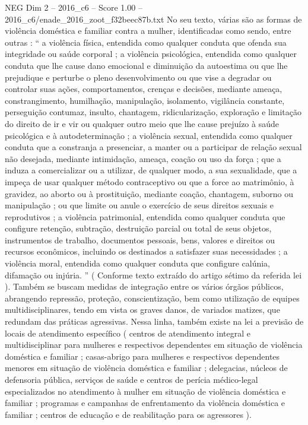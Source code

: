 \begin{textsample}{NEG Dim 2 – 2016\_c6 – Score 1.00 – 2016\_c6/enade\_2016\_zoot\_f32beec87b.txt}
No seu texto, várias são as formas de violência doméstica e familiar contra a mulher, identificadas como sendo, entre outras : “ a violência física, entendida como qualquer conduta que ofenda sua integridade ou saúde corporal ; a violência psicológica, entendida como qualquer conduta que lhe cause dano emocional e diminuição da autoestima ou que lhe prejudique e perturbe o pleno desenvolvimento ou que vise a degradar ou controlar suas ações, comportamentos, crenças e decisões, mediante ameaça, constrangimento, humilhação, manipulação, isolamento, vigilância constante, perseguição contumaz, insulto, chantagem, ridicularização, exploração e limitação do direito de ir e vir ou qualquer outro meio que lhe cause prejuízo à saúde psicológica e à autodeterminação ; a violência sexual, entendida como qualquer conduta que a constranja a presenciar, a manter ou a participar de relação sexual não desejada, mediante intimidação, ameaça, coação ou uso da força ; que a induza a comercializar ou a utilizar, de qualquer modo, a sua sexualidade, que a impeça de usar qualquer método contraceptivo ou que a force ao matrimônio, à gravidez, ao aborto ou à prostituição, mediante coação, chantagem, suborno ou manipulação ; ou que limite ou anule o exercício de seus direitos sexuais e reprodutivos ; a violência patrimonial, entendida como qualquer conduta que configure retenção, subtração, destruição parcial ou total de seus objetos, instrumentos de trabalho, documentos pessoais, bens, valores e direitos ou recursos econômicos, incluindo os destinados a satisfazer suas necessidades ; a violência moral, entendida como qualquer conduta que configure calúnia, difamação ou injúria. ” ( Conforme texto extraído do artigo sétimo da referida lei ).
Também se buscam medidas de integração entre os vários órgãos públicos, abrangendo repressão, proteção, conscientização, bem como utilização de equipes multidisciplinares, tendo em vista os graves danos, de variados matizes, que redundam das práticas agressivas.
Nessa linha, também existe na lei a previsão de locais de atendimento específico ( centros de atendimento integral e multidisciplinar para mulheres e respectivos dependentes em situação de violência doméstica e familiar ; casas-abrigo para mulheres e respectivos dependentes menores em situação de violência doméstica e familiar ; delegacias, núcleos de defensoria pública, serviços de saúde e centros de perícia médico-legal especializados no atendimento à mulher em situação de violência doméstica e familiar ; programas e campanhas de enfrentamento da violência doméstica e familiar ; centros de educação e de reabilitação para os agressores ).

\end{textsample}
